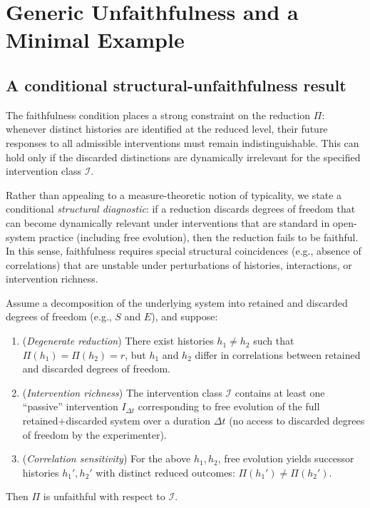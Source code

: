 \section{Generic Unfaithfulness and a Minimal Example}

\subsection{A conditional structural-unfaithfulness result}

The faithfulness condition places a strong constraint on the reduction $\Pi$: whenever
distinct histories are identified at the reduced level, their future responses to all
admissible interventions must remain indistinguishable. This can hold only if the
discarded distinctions are dynamically irrelevant for the specified intervention class
$\mathcal{I}$.

Rather than appealing to a measure-theoretic notion of typicality, we state a conditional
\emph{structural diagnostic}: if a reduction discards degrees of freedom that can become
dynamically relevant under interventions that are standard in open-system practice
(including free evolution), then the reduction fails to be faithful. In this sense,
faithfulness requires special structural coincidences (e.g., absence of correlations)
that are unstable under perturbations of histories, interactions, or intervention
richness.

\begin{proposition}
\label{prop:unfaithful-from-correlations}
Assume a decomposition of the underlying system into retained and discarded degrees of
freedom (e.g., $S$ and $E$), and suppose:
\begin{enumerate}
  \item (\emph{Degenerate reduction}) There exist histories $h_1 \neq h_2$ such that
        $\Pi(h_1)=\Pi(h_2)=r$, but $h_1$ and $h_2$ differ in correlations between retained
        and discarded degrees of freedom.
  \item (\emph{Intervention richness}) The intervention class $\mathcal{I}$ contains at least
        one ``passive'' intervention $I_{\Delta t}$ corresponding to free evolution of the
        full retained+discarded system over a duration $\Delta t$ (no access to discarded
        degrees of freedom by the experimenter).
  \item (\emph{Correlation sensitivity}) For the above $h_1,h_2$, free evolution yields
        successor histories $h_1' , h_2'$ with distinct reduced outcomes:
        $\Pi(h_1') \neq \Pi(h_2')$.
\end{enumerate}
Then $\Pi$ is unfaithful with respect to $\mathcal{I}$.
\end{proposition}

